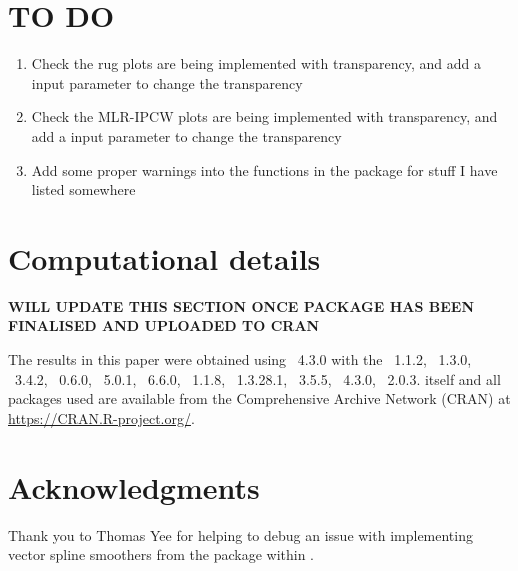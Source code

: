 \documentclass[nojss]{jss}
\begin{document}
\section*{TO DO}

\begin{enumerate}
  \item Check the rug plots are being implemented with transparency, and add a input parameter to change the transparency
  \item Check the MLR-IPCW plots are being implemented with transparency, and add a input parameter to change the transparency
  \item Add some proper warnings into the functions in the package for stuff I have listed somewhere
\end{enumerate}

\section*{Computational details}

\textbf{WILL UPDATE THIS SECTION ONCE PACKAGE HAS BEEN FINALISED AND UPLOADED TO CRAN}

The results in this paper were obtained using
~4.3.0 with the
~1.1.2,
~1.3.0,
~3.4.2,
~0.6.0,
~5.0.1,
~6.6.0,
~1.1.8,
~1.3.28.1,
~3.5.5,
~4.3.0,
~2.0.3.  itself
and all packages used are available from the Comprehensive
 Archive Network (CRAN) at
\url{https://CRAN.R-project.org/}.

\section*{Acknowledgments}

\begin{leftbar}
Thank you to Thomas Yee for helping to debug an issue with implementing vector spline smoothers from the  package within .
\end{leftbar}




\newpage
\end{document}
